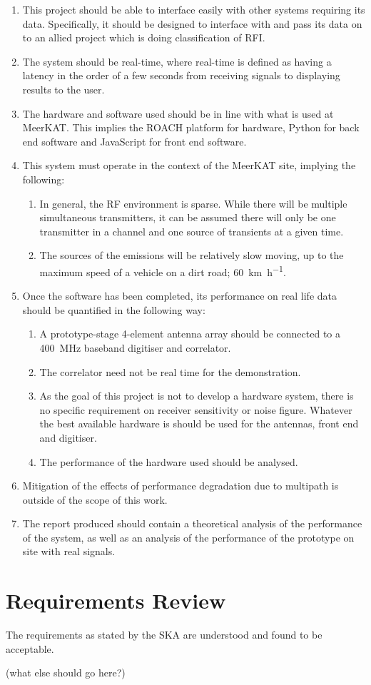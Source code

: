 \begin{enumerate}
  \item This project should be able to interface easily with other systems requiring its data. Specifically, it should be designed to interface with and pass its data on to an allied project which is doing classification of RFI.
  \item The system should be real-time, where real-time is defined as having a latency in the order of a few seconds from receiving signals to displaying results to the user. 
  \item The hardware and software used should be in line with what is used at MeerKAT. This implies the ROACH platform for hardware, Python for back end software and JavaScript for front end software.  
  \item This system must operate in the context of the MeerKAT site, implying the following:
  \begin{enumerate}
      \item In general, the RF environment is sparse. While there will be multiple simultaneous transmitters, it can be assumed there will only be one transmitter in a channel and one source of transients at a given time.
      \item The sources of the emissions will be relatively slow moving, up to the maximum speed of a vehicle on a dirt road; \SI[per-mode=symbol]{60}{\kilo\metre\per\hour}.
  \end{enumerate}

  \item Once the software has been completed, its performance on real life data should be quantified in the following way:
    \begin{enumerate}
      \item A prototype-stage 4-element antenna array should be connected to a \SI{400}{\mega\hertz} baseband digitiser and correlator.
      \item The correlator need not be real time for the demonstration.
      \item As the goal of this project is not to develop a hardware system, there is no specific requirement on receiver sensitivity or noise figure. Whatever the best available hardware is should be used for the antennas, front end and digitiser. 
      \item The performance of the hardware used should be analysed. 
    \end{enumerate}
  \item Mitigation of the effects of performance degradation due to multipath is outside of the scope of this work.

  \item The report produced should contain a theoretical analysis of the performance of the system, as well as an analysis of the performance of the prototype on site with real signals. 
\end{enumerate}

\section{Requirements Review}
The requirements as stated by the SKA are understood and found to be acceptable. 

(what else should go here?)
